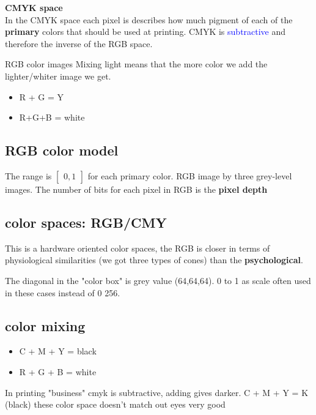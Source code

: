 \textbf{CMYK space} \\
In the CMYK space each pixel is describes how much pigment of each of the \textbf{primary} colors that should be used at printing. CMYK is \textcolor{blue}{subtractive} and therefore the inverse of the RGB space. 

\begin{example}{RGB color images}
 Mixing light means that the more color we add the lighter/whiter image we get. 
 \begin{itemize}
 	\item R + G = Y
 	\item R+G+B = white
 \end{itemize}
 \end{example}	 


 \subsection*{RGB color model}
 The range is $\begin{bmatrix} 0,1 \end{bmatrix}$ for each primary color. RGB image by three grey-level images. The number of bits for each pixel in RGB is the \textbf{pixel depth} 

 \subsection*{color spaces: RGB/CMY}
 This is a hardware oriented color spaces, the RGB is closer in terms of physiological similarities (we got three types of cones) than the \textbf{psychological}. 
 \begin{wbox}{}
The diagonal in the "color box" is grey value (64,64,64). 0 to 1 as scale often used in these cases instead of 0 256. 
 \end{wbox}
 

\subsection*{color mixing}
\begin{itemize}
	\item C + M + Y = black
	\item R + G + B = white
\end{itemize}

\begin{wbox}{}
In printing "business" cmyk is subtractive, adding gives darker. C + M + Y = K (black)
these color space doesn't match out eyes very good
\end{wbox}


